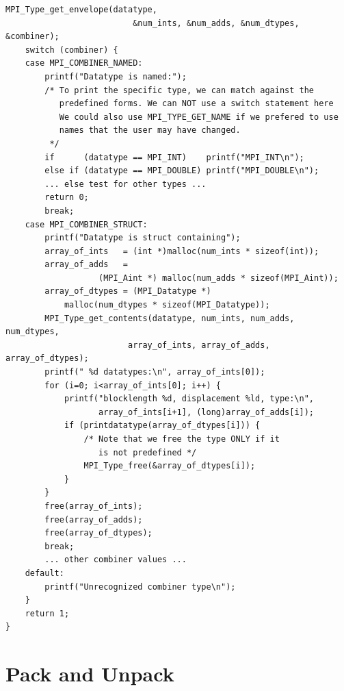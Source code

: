 \begin{example}
\begin{lstlisting}[language={[MPI]C}]
    MPI_Type_get_envelope(datatype,
                          &num_ints, &num_adds, &num_dtypes, &combiner);
    switch (combiner) {
    case MPI_COMBINER_NAMED:
        printf("Datatype is named:");
        /* To print the specific type, we can match against the
           predefined forms. We can NOT use a switch statement here
           We could also use MPI_TYPE_GET_NAME if we prefered to use
           names that the user may have changed.
         */
        if      (datatype == MPI_INT)    printf("MPI_INT\n");
        else if (datatype == MPI_DOUBLE) printf("MPI_DOUBLE\n");
        ... else test for other types ...
        return 0;
        break;
    case MPI_COMBINER_STRUCT:
        printf("Datatype is struct containing");
        array_of_ints   = (int *)malloc(num_ints * sizeof(int));
        array_of_adds   =
                   (MPI_Aint *) malloc(num_adds * sizeof(MPI_Aint));
        array_of_dtypes = (MPI_Datatype *)
            malloc(num_dtypes * sizeof(MPI_Datatype));
        MPI_Type_get_contents(datatype, num_ints, num_adds, num_dtypes,
                         array_of_ints, array_of_adds, array_of_dtypes);
        printf(" %d datatypes:\n", array_of_ints[0]);
        for (i=0; i<array_of_ints[0]; i++) {
            printf("blocklength %d, displacement %ld, type:\n",
                   array_of_ints[i+1], (long)array_of_adds[i]);
            if (printdatatype(array_of_dtypes[i])) {
                /* Note that we free the type ONLY if it
                   is not predefined */
                MPI_Type_free(&array_of_dtypes[i]);
            }
        }
        free(array_of_ints);
        free(array_of_adds);
        free(array_of_dtypes);
        break;
        ... other combiner values ...
    default:
        printf("Unrecognized combiner type\n");
    }
    return 1;
}
\end{lstlisting}
\end{example}



\section{Pack and Unpack}
\label{sec:pt2pt-packing}

